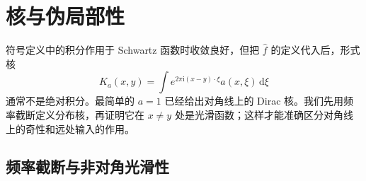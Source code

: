 \section{核与伪局部性}
\label{b2:sec:app-G-2}

符号定义中的积分作用于 Schwartz 函数时收敛良好，但把 \(\widehat f\) 的定义代入后，形式核
\[
 K_a(x,y)=\int e^{2\pi\mathrm i(x-y)\cdot\xi}a(x,\xi)\,\mathrm d\xi
\]
通常不是绝对积分。最简单的 \(a=1\) 已经给出对角线上的 Dirac 核。我们先用频率截断定义分布核，再证明它在 \(x\ne y\) 处是光滑函数；这样才能准确区分对角线上的奇性和远处输入的作用。

\subsection{频率截断与非对角光滑性}
\label{b2:subsec:G0201}


